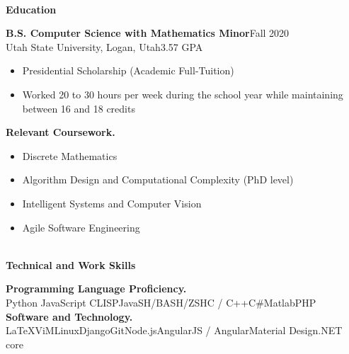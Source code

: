 \documentclass[letterpaper,11pt]{article}
\begin{document}


\begin{Large}\textbf{\\Education}\end{Large}

\textbf{B.S. Computer Science with Mathematics Minor}\hfill Fall 2020\\
Utah State University, Logan, Utah\hfill 3.57 GPA
\begin{itemize}[noitemsep,topsep=0pt]
	\item Presidential Scholarship (Academic Full-Tuition)
	\item Worked 20 to 30 hours per week during the school year while maintaining between 16 and 18 credits\\
\end{itemize}

\textbf{Relevant Coursework.}
\begin{itemize}[noitemsep,topsep=0pt]
	\item Discrete Mathematics
	\item Algorithm Design and Computational Complexity (PhD level)
	\item Intelligent Systems and Computer Vision
	\item Agile Software Engineering
\end{itemize}


\begin{Large}\textbf{\\Technical and Work Skills}\end{Large}

\textbf{Programming Language Proficiency.} \\
Python \hfill JavaScript \hfill CLISP\hfill Java\hfill SH/BASH/ZSH\hfill C / C++\hfill C\#\hfill Matlab\hfill PHP\\

\textbf{Software and Technology.}\\
\LaTeX\hfill ViM\hfill Linux\hfill Django\hfill Git\hfill Node.js\hfill AngularJS / Angular\hfill Material Design\hfill .NET core\\
\end{document}
